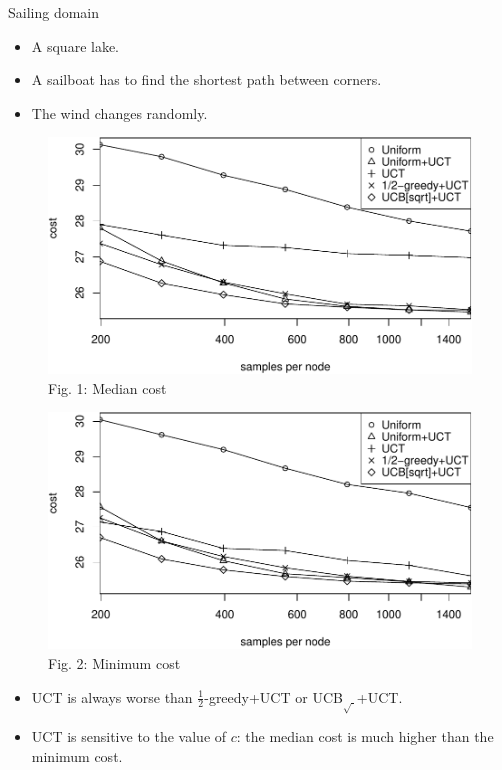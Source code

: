 \documentclass{beamer}
\begin{document}
\begin{frame}{Sailing domain}
\begin{itemize}
\item A square lake.
\item A sailboat has to find the shortest path between corners.
\item The wind changes randomly.
\end{itemize}
\begin{figure}[h!]
  \begin{minipage}[b]{0.45\linewidth}
    \centering
    \includegraphics[scale=0.32]{costs-size=6-group=median.pdf}\\
    {\scriptsize Fig. 1: Median cost}
  \end{minipage}
  \begin{minipage}[b]{0.5\linewidth}
    \centering
    \includegraphics[scale=0.32]{costs-size=6-group=minimum.pdf}\\
    {\scriptsize Fig. 2: Minimum cost}
  \end{minipage}
  \label{fig:sailing-cost-vs-nsamples}
\end{figure}
\begin{itemize}
\item UCT is always worse than $\frac 1 2$-greedy+UCT or
UCB$_{\sqrt{\cdot}}$+UCT. 
\item UCT is sensitive to the value of $c$: the median cost is
much higher than the minimum cost.
\end{itemize}
\end{frame}
\end{document}
